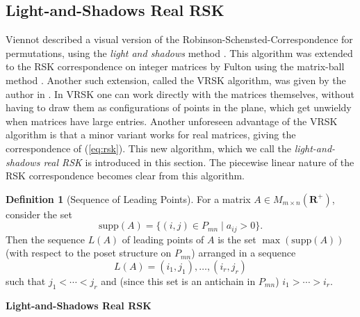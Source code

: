 \documentclass[10pt]{amsproc}
\theoremstyle{definition}
\newtheorem{definition}[theorem]{Definition}
\theoremstyle{remark}
\newcommand{\rp}{\mathbf{R}^+}
\newcommand{\supp}{\mathrm{supp}}
\begin{document}
\subsection{Light-and-Shadows Real RSK}
\label{sec:light-and-shadows-rsk}
Viennot described a visual version of the Robinson-Schensted-Correspondence for permutations, using the \emph{light and shadows} method \cite{viennot1977forme}.
This algorithm was extended to the RSK correspondence on integer matrices by Fulton using the matrix-ball method \cite{fulton}.
Another such extension, called the VRSK algorithm, was given by the author in \cite[Chapter~3]{rtcv}.
In VRSK one can work directly with the matrices themselves, without having to draw them as configurations of points in the plane, which get unwieldy when matrices have large entries.
Another unforeseen advantage of the VRSK algorithm is that a minor variant works for real matrices, giving the correspondence of (\ref{eq:rsk}).
This new algorithm, which we call the \emph{light-and-shadows real RSK} is introduced in this section.
The piecewise linear nature of the RSK correspondence becomes clear from this algorithm.
\begin{definition}
  [Sequence of Leading Points]
  For a matrix $A\in M_{m\times n}(\rp)$, consider the set
  \begin{displaymath}
    \supp(A) = \{(i,j)\in P_{mn}\mid a_{ij}>0\}.
  \end{displaymath}
  Then the sequence $L(A)$ of leading points of $A$ is the set $\max(\supp(A))$ (with respect to the poset structure on $P_{mn}$) arranged in a sequence
  \begin{displaymath}
    L(A) = (i_1,j_1),\dotsc,(i_r,j_r)
  \end{displaymath}
  such that $j_1<\dotsb <j_r$ and (since this set is an antichain in $P_{mn}$) $i_1>\dotsb >i_r$.
\end{definition}
\begin{center}
  \textbf{Light-and-Shadows Real RSK}
\end{center}
\end{document}
